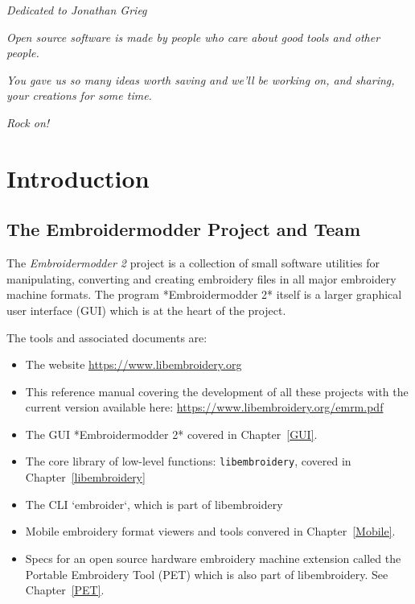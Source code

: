 \documentclass[11pt]{report}
\begin{document}
\newpage

\vspace*{8cm}

\begin{center}
    \emph{Dedicated to Jonathan Grieg}
    
    \vspace{1cm}
    
    \emph{Open source software is made by people who care about good tools
     and other people.}
    
    \vspace{1cm}
    
    \emph{You gave us so many ideas worth saving and we'll be working on,
    and sharing, your creations for some time.}
    
    \vspace{1cm}
    
    \emph{Rock on!}
\end{center}
    
\newpage

\tableofcontents

\chapter{Introduction}

\section{The Embroidermodder Project and Team}

The \emph{Embroidermodder 2} project is a collection of small software
utilities for manipulating, converting and creating embroidery files in all
major embroidery machine formats. The program *Embroidermodder 2* itself
is a larger graphical user interface (GUI) which is at the heart of the project.

The tools and associated documents are:

\begin{itemize}
\item The website \url{https://www.libembroidery.org}
\item This reference manual covering the development of all these projects with
the current version available here: \url{https://www.libembroidery.org/emrm.pdf}
\item The GUI *Embroidermodder 2* covered in Chapter~\ref{GUI}.
\item The core library of low-level functions: \texttt{libembroidery}, covered in
Chapter~\ref{libembroidery}
\item The CLI `embroider`, which is part of libembroidery
\item Mobile embroidery format viewers and tools convered in Chapter~\ref{Mobile}.
\item Specs for an open source hardware embroidery machine extension called the
Portable Embroidery Tool (PET) which is also part of libembroidery.
See Chapter~\ref{PET}.
\end{itemize}
\end{document}

